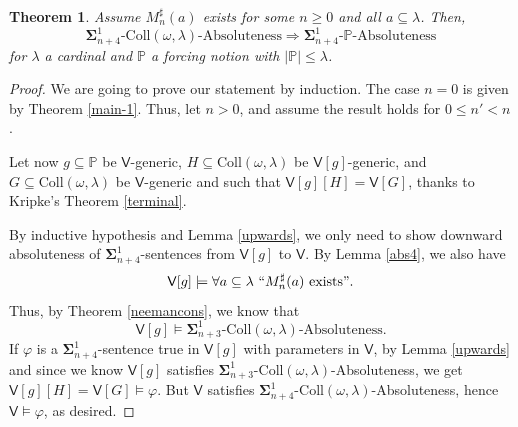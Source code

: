 \documentclass[10pt]{amsart}
\renewcommand\le\leqslant
\renewcommand\ge\geqslant
\newtheorem{theorem}{Theorem}[section]
\theoremstyle{definition}
\begin{document}
\begin{theorem}\label{nge5}
Assume $M_n^\sharp(a)$ exists for some $n\ge0$ and all $a\subseteq\lambda$. Then,  \[\boldsymbol\Sigma^1_{n+4}\text{-}\mathrm{Coll}(\omega,\lambda)\text{-Absoluteness} \Rightarrow \boldsymbol\Sigma^1_{n+4}\text{-}\mathbb P\text{-Absoluteness}\] for $\lambda$ a cardinal and $\mathbb P$ a forcing notion with $|\mathbb P|\le\lambda$.    
\end{theorem}


\begin{proof}We are going to prove our statement by induction. The case $n=0$ is given by Theorem \ref{main-1}. Thus, let $n>0$, and assume the result holds for $0\le n'<n$.\medskip


Let now $g\subseteq\mathbb P$ be $\mathsf V$-generic, $H\subseteq\mathrm{Coll}(\omega,\lambda)$ be $\mathsf V[g]$-generic, and $G\subseteq\mathrm{Coll}(\omega,\lambda)$ be $\mathsf V$-generic and such that $\mathsf V[g][H]=\mathsf V[G]$, thanks to Kripke's Theorem \ref{terminal}.\medskip

By inductive hypothesis and Lemma  \ref{upwards},  we only need to show downward absoluteness of $\boldsymbol\Sigma^1_{n+4}$-sentences from $\mathsf V[g]$ to $\mathsf V$. By Lemma \ref{abs4}, we also have
\[\mathsf V[g] \models \forall a\subseteq\lambda\ ``M_n^\sharp(a)\ \text{exists}".\]
Thus, by Theorem \ref{neemancons}, we know that \[\mathsf V[g]\models\boldsymbol\Sigma^1_{n+3}\text{-}\mathrm{Coll}(\omega,\lambda)\text{-Absoluteness.}\]
If $\varphi$ is a $\boldsymbol\Sigma^1_{n+4}$-sentence true in $\mathsf V[g]$ with parameters in $\mathsf V$, by Lemma \ref{upwards} and since we know $\mathsf V[g]$ satisfies $\boldsymbol\Sigma^1_{n+3}$-$\mathrm{Coll}(\omega,\lambda)$-Absoluteness, we get $\mathsf V[g][H]=\mathsf V[G]\models\varphi$. But $\mathsf V$ satisfies $\boldsymbol\Sigma^1_{n+4}$-$\mathrm{Coll}(\omega,\lambda)$-Absoluteness, hence $\mathsf V\models\varphi$, as desired.
\end{proof}
\end{document}
